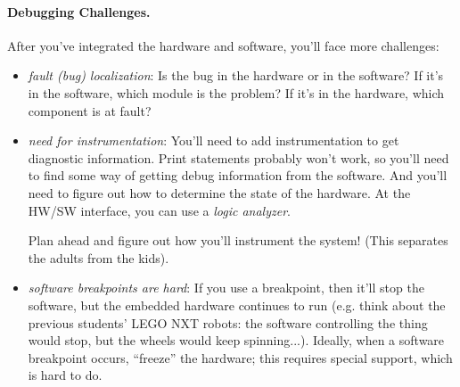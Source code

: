 \begin{center}
\end{center}

\paragraph{Debugging Challenges.} After you've integrated the hardware
and software, you'll face more challenges:

\begin{itemize}
\item \emph{fault (bug) localization}: Is the bug in the hardware or in the software? If it's in the software, which module is the problem? If it's in the hardware, which component is at fault?
\item \emph{need for instrumentation}: You'll need to add instrumentation to get diagnostic information. Print statements probably won't work, so you'll need 
to find some way of getting debug information from the software. And you'll
need to figure out how to determine the state of the hardware. At the
HW/SW interface, you can use a \emph{logic analyzer}.

Plan ahead and figure out how you'll instrument the system! (This separates the adults from the kids).

\item \emph{software breakpoints are hard}: If you use a breakpoint, then
it'll stop the software, but the embedded hardware continues to run (e.g.
think about the previous students' LEGO NXT robots: the software controlling the thing would stop, but the wheels would keep spinning...). Ideally, when a software breakpoint
occurs, ``freeze'' the hardware; this requires special support, which 
is hard to do.
\end{itemize}

